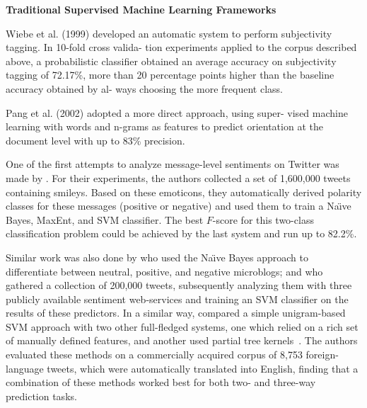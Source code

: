\textbf{Traditional Supervised Machine Learning Frameworks}


Wiebe et al. (1999) developed an automatic system to perform
subjectivity tagging. In 10-fold cross valida- tion experiments
applied to the corpus described above, a probabilistic classifier
obtained an average accuracy on subjectivity tagging of 72.17\%, more
than 20 percentage points higher than the baseline accuracy obtained
by al- ways choosing the more frequent class.


Pang et al.  (2002) adopted a more direct approach, using super- vised
machine learning with words and n-grams as features to predict
orientation at the document level with up to 83\% precision.

\todo[inline]{}

One of the first attempts to analyze message-level sentiments on
Twitter was made by \citet{Go:09}.  For their experiments, the authors
collected a set of 1,600,000 tweets containing smileys.  Based on
these emoticons, they automatically derived polarity classes for these
messages (positive or negative) and used them to train a Na\"{\i}ve
Bayes, MaxEnt, and SVM classifier.  The best $F$-score for this
two-class classification problem could be achieved by the last system
and run up to 82.2\%.

Similar work was also done by \citet{Pak:10} who used the Na\"{\i}ve
Bayes approach to differentiate between neutral, positive, and
negative microblogs; and \citet{Barbosa:10} who gathered a collection
of 200,000 tweets, subsequently analyzing them with three publicly
available sentiment web-services and training an SVM classifier on the
results of these predictors.  In a similar way, \citet{Agarwal:11}
compared a simple unigram-based SVM approach with two other
full-fledged systems, one which relied on a rich set of manually
defined features, and another used partial tree
kernels~\cite{Moschitti:06}.  The authors evaluated these methods on a
commercially acquired corpus of 8,753 foreign-language tweets, which
were automatically translated into English, finding that a combination
of these methods worked best for both two- and three-way prediction
tasks.

